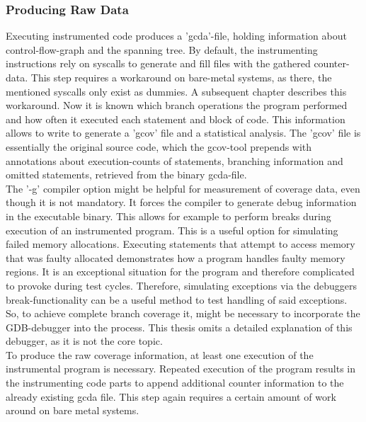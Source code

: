 \documentclass[master,english,smartquotes,apa]{hgbthesis}
\begin{document}
			\subsubsection{Producing Raw Data}
				Executing instrumented code produces a 'gcda'-file, holding information about control-flow-graph and the spanning tree. By default, the instrumenting instructions rely on syscalls to generate and fill files with the gathered counter-data. This step requires a workaround on bare-metal systems, as there, the mentioned syscalls only exist as dummies. A subsequent chapter describes this workaround. Now it is known which branch operations the program performed and how often it executed  each statement and block of code. This information allows to write to generate a 'gcov' file and a statistical analysis. The 'gcov' file is essentially the original source code, which the gcov-tool prepends with annotations about execution-counts of statements, branching information and omitted statements, retrieved from the binary gcda-file. \\

				The '-g' compiler option might be helpful for measurement of coverage data, even though it is not mandatory. It forces the compiler to generate debug information in the executable binary. This allows for example to perform breaks during execution of an instrumented program. This is a useful option for simulating failed memory allocations. Executing statements that attempt to access memory that was faulty allocated demonstrates how a program handles faulty memory regions. It is an exceptional situation for the program and therefore complicated to provoke during test cycles. Therefore, simulating exceptions via the debuggers break-functionality can be a useful method to test handling of said exceptions. So, to achieve complete branch coverage it, might be necessary to incorporate the GDB-debugger into the process. This thesis omits a detailed explanation of this debugger, as it is not the core topic. \cite{gcov} \\
				
				To produce the raw coverage information, at least one execution of the instrumental program is necessary. Repeated execution of the program results in the instrumenting code parts to append additional counter information to the already existing gcda file. This step again requires a certain amount of work around on bare metal systems.
\end{document}
